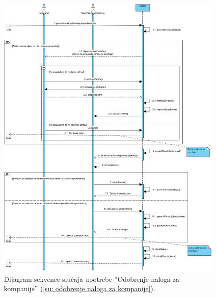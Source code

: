\begin{figure}[H]
	\centering
	\includegraphics[width=\textwidth]{dijagrami/dijagrami-sekvence/odobrenje-naloga-za-kompanije.png}
	\caption{Dijagram sekvence slu\v caja upotrebe ''Odobrenje naloga za kompanije'' (\ref{su: odobrenje naloga za kompanije}).}
\end{figure}

